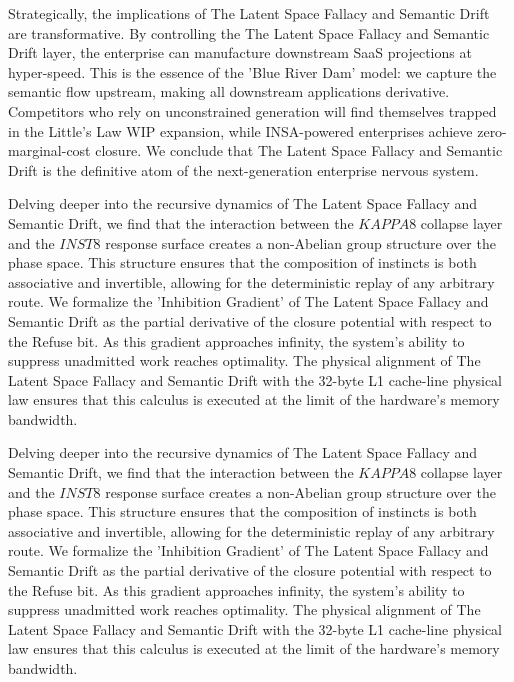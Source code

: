 \documentclass[12pt,a4paper,oneside]{book}
\begin{document}
Strategically, the implications of The Latent Space Fallacy and Semantic Drift are transformative. By controlling the The Latent Space Fallacy and Semantic Drift layer, the enterprise can manufacture downstream SaaS projections at hyper-speed. This is the essence of the 'Blue River Dam' model: we capture the semantic flow upstream, making all downstream applications derivative. Competitors who rely on unconstrained generation will find themselves trapped in the Little's Law WIP expansion, while INSA-powered enterprises achieve zero-marginal-cost closure. We conclude that The Latent Space Fallacy and Semantic Drift is the definitive atom of the next-generation enterprise nervous system. 

Delving deeper into the recursive dynamics of The Latent Space Fallacy and Semantic Drift, we find that the interaction between the $KAPPA8$ collapse layer and the $INST8$ response surface creates a non-Abelian group structure over the phase space. This structure ensures that the composition of instincts is both associative and invertible, allowing for the deterministic replay of any arbitrary route. We formalize the 'Inhibition Gradient' of The Latent Space Fallacy and Semantic Drift as the partial derivative of the closure potential with respect to the Refuse bit. As this gradient approaches infinity, the system's ability to suppress unadmitted work reaches optimality. The physical alignment of The Latent Space Fallacy and Semantic Drift with the 32-byte L1 cache-line physical law ensures that this calculus is executed at the limit of the hardware's memory bandwidth. 

Delving deeper into the recursive dynamics of The Latent Space Fallacy and Semantic Drift, we find that the interaction between the $KAPPA8$ collapse layer and the $INST8$ response surface creates a non-Abelian group structure over the phase space. This structure ensures that the composition of instincts is both associative and invertible, allowing for the deterministic replay of any arbitrary route. We formalize the 'Inhibition Gradient' of The Latent Space Fallacy and Semantic Drift as the partial derivative of the closure potential with respect to the Refuse bit. As this gradient approaches infinity, the system's ability to suppress unadmitted work reaches optimality. The physical alignment of The Latent Space Fallacy and Semantic Drift with the 32-byte L1 cache-line physical law ensures that this calculus is executed at the limit of the hardware's memory bandwidth. 
\end{document}
